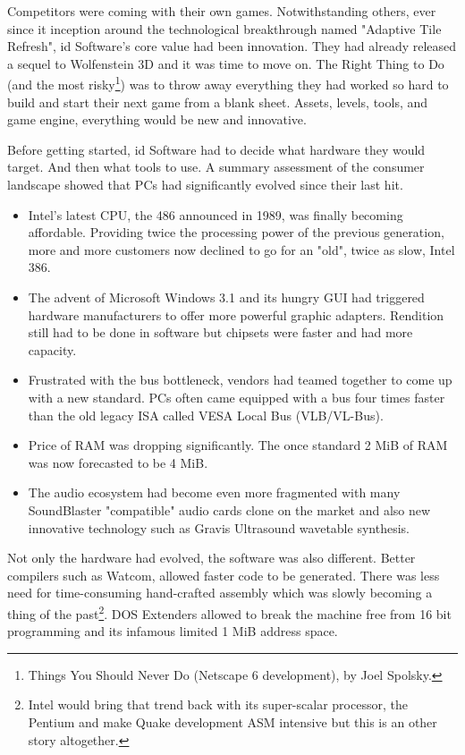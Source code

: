 Competitors were coming with their own games. Notwithstanding others, ever since it inception around the technological breakthrough named "Adaptive Tile Refresh", id Software's core value had been innovation. They had already released a sequel to Wolfenstein 3D and it was time to move on. The Right Thing to Do (and the most risky\footnote{Things You Should Never Do (Netscape 6 development), by Joel Spolsky.}) was to throw away everything they had worked so hard to build and start their next game from a blank sheet. Assets, levels, tools, and game engine, everything would be new and innovative.\\
\par
Before getting started, id Software had to decide what hardware they would target. And then what tools to use. A summary assessment of the consumer landscape showed that PCs had significantly evolved since their last hit.
\begin{itemize}
\item Intel's latest CPU, the 486 announced in 1989, was finally becoming affordable. Providing twice the processing power of the previous generation, more and more customers now declined to go for an "old", twice as slow, Intel 386. 
\item The advent of Microsoft Windows 3.1 and its hungry GUI had triggered hardware manufacturers to offer more powerful graphic adapters. Rendition still had to be done in software but chipsets were faster and had more capacity.
\item Frustrated with the bus bottleneck, vendors had teamed together to come up with a new standard. PCs often came equipped with a bus four times faster than the old legacy ISA called VESA Local Bus (VLB/VL-Bus). 
\item Price of RAM was dropping significantly. The once standard 2 MiB of RAM was now forecasted to be 4 MiB. 
\item The audio ecosystem had become even more fragmented with many SoundBlaster "compatible" audio cards clone on the market and also new innovative technology such as Gravis Ultrasound wavetable synthesis.\\
\end{itemize}
 \par 
 Not only the hardware had evolved, the software was also different. Better compilers such as Watcom, allowed faster code to be generated. There was less need for time-consuming hand-crafted assembly which was slowly becoming a thing of the past\footnote{Intel would bring that trend back with its super-scalar processor, the Pentium and make Quake development ASM intensive but this is an other story altogether.}. DOS Extenders allowed to break the machine free from 16 bit programming and its infamous limited 1 MiB address space.\\

